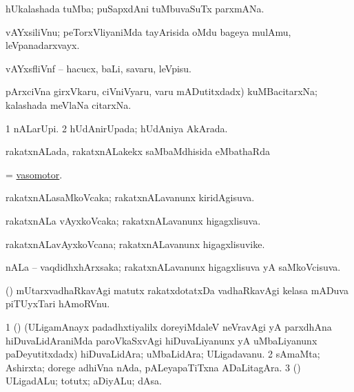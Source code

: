 \bentry
{} 
\gl{\nA}
\bmng
 hUkalashada tuMba; puSapxdAni tuMbuvaSuTx parxmANa. 
\emng
\eentry

\bentry
{} 
\gl{\nA}
\expl{(\P)}
\bmng
 vAYxsiliVnu; peTorxVliyaniMda tayArisida oMdu bageya mulAmu, leVpanadarxvayx. 
\emng
\eentry

\bentry
{} 
\gl{\sakirx}
\expl{}
\bmng
 vAYxsfliVnf -- hacucx, baLi, savaru, leVpisu. 
\emng
\eentry

\bentry
{}
\gl{\nA}
\expl{}
\bmng
 \eng{(} pArxciVna girxVkaru, ciVniVyaru, \mo varu mADutitxdadx) kuMBacitarxNa; kalashada meVlaNa citarxNa. 
\emng
\eentry

\bentry
{} 
\gl{\gu}
\expl{}
\bmng
\bnum
\num{1} nALarUpi. 
\num{2} hUdAnirUpada; hUdAniya AkArada. 
\enum
\emng
\eentry

\bentry
{} 
\gl{\sapUpa}
\expl{}
\bmng
 rakatxnALada, rakatxnALakekx saMbaMdhisida eMbathaRda \sapUpa 
\emng
\eentry

\bentry
{} 
\gl{\gu}
\expl{}
\bmng
 = \hyperlink{vasomotor}{vasomotor}. 
\emng
\eentry

\bentry
{} 
\gl{\gu}
\expl{}
\bmng
 rakatxnALasaMkoVcaka; rakatxnALavanunx kiridAgisuva. 
\emng
\eentry

\bentry
{} 
\gl{\gu}
\expl{}
\bmng
 rakatxnALa vAyxkoVcaka; rakatxnALavanunx higagxlisuva. 
\emng
\eentry

\bentry
{} 
\gl{\nA}
\expl{}
\bmng
 rakatxnALavAyxkoVcana; rakatxnALavanunx higagxlisuvike. 
\emng
\eentry

\bentry
{} 
\gl{\gu}
\expl{}
\bmng
 nALa -- vaqdidhxhArxsaka; rakatxnALavanunx higagxlisuva yA saMkoVcisuva. 
\emng
\eentry

\bentry
{} 
\gl{\nA}
\expl{}
\bmng
 (\jiVra) mUtarxvadhaRkavAgi matutx rakatxdotatxDa vadhaRkavAgi kelasa mADuva piTUyxTari hAmoRVnu. 
\emng
\eentry

\bentry
{} 
\gl{\nA}
\expl{}
\bmng
\bnum
\num{1} (\ca) (ULigamAnayx padadhxtiyalilx doreyiMdaleV neVravAgi yA parxdhAna hiDuvaLidAraniMda paroVkaSxvAgi hiDuvaLiyanunx yA uMbaLiyanunx paDeyutitxdadx) hiDuvaLidAra; uMbaLidAra; ULigadavanu. 
\num{2} sAmaMta; Ashirxta; dorege adhiVna nAda, pALeyapaTiTxna ADaLitagAra. 
\num{3} (\rUpa) ULigadALu; totutx; aDiyALu; dAsa. 
\enum
\emng
\eentry

